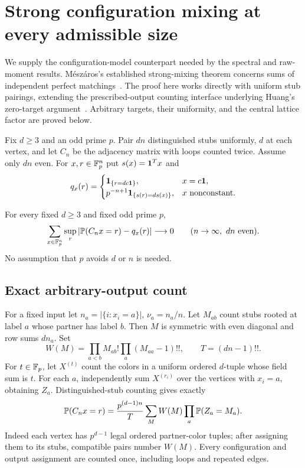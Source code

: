\section{Strong configuration mixing at every admissible size}\label{app:configuration-mixing}
We supply the configuration-model counterpart needed by the spectral
and raw-moment results. M\'esz\'aros's established strong-mixing
theorem concerns sums of independent perfect matchings~\cite{Meszaros}.
The proof here works directly with uniform stub pairings, extending
the prescribed-output counting interface underlying Huang's
zero-target argument~\cite[Proposition 2.2]{Huang}. Arbitrary targets,
their uniformity, and the central lattice factor are proved below.

Fix $d\ge3$ and an odd prime $p$. Pair $dn$ distinguished stubs
uniformly, $d$ at each vertex, and let $C_n$ be the adjacency matrix
with loops counted twice. Assume only $dn$ even. For $x,r\in\mathbb F_p^n$
put $s(x)=\mathbf 1^Tx$ and
\[
 q_x(r)=\begin{cases}
 \mathbf 1_{\{r=dc\mathbf 1\}},&x=c\mathbf 1,\\
 p^{-n+1}\mathbf 1_{\{s(r)=ds(x)\}},&x\text{ nonconstant}.
 \end{cases}
\]
\begin{theorem}\label{thm:config-mixing}
For every fixed $d\ge3$ and fixed odd prime $p$,
\begin{equation}\label{eq:config-mixing}
 \sum_{x\in\mathbb F_p^n}\sup_r|\mathbb P(C_nx=r)-q_x(r)|\longrightarrow0
 \qquad(n\to\infty,\ dn\text{ even}).
\end{equation}
No assumption that $p$ avoids $d$ or $n$ is needed.
\end{theorem}

\subsection{Exact arbitrary-output count}
For a fixed input let $n_a=|\{i:x_i=a\}|$, $\nu_a=n_a/n$.
Let $M_{ab}$ count stubs rooted at label $a$ whose partner has label
$b$. Then $M$ is symmetric with even diagonal and row sums $dn_a$.
Set
\[
 W(M)=\prod_{a<b}M_{ab}!\prod_a(M_{aa}-1)!!,
 \qquad T=(dn-1)!!.
\]
For $t\in\mathbb F_p$, let $X^{(t)}$ count the colors in a uniform ordered
$d$-tuple whose field sum is $t$. For each $a$, independently sum
$X^{(r_i)}$ over the vertices with $x_i=a$, obtaining $Z_a$.
Distinguished-stub counting gives exactly
\begin{equation}\label{eq:config-target-count}
 \mathbb P(C_nx=r)=\frac{p^{(d-1)n}}{T}
       \sum_M W(M)\prod_a\mathbb P(Z_a=M_a).
\end{equation}
Indeed each vertex has $p^{d-1}$ legal ordered partner-color tuples;
after assigning them to its stubs, compatible pairs number $W(M)$.
Every configuration and output assignment are counted once, including
loops and repeated edges.

